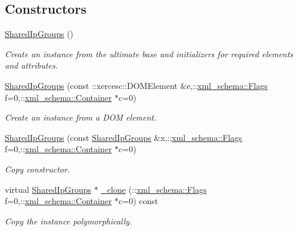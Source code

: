 \subsection*{Constructors}
\begin{DoxyCompactItemize}
\item 
\hypertarget{classopenstack_1_1xml_1_1SharedIpGroups_ac4c11c01375108c9f27a5f9433c47719}{
\hyperlink{classopenstack_1_1xml_1_1SharedIpGroups_ac4c11c01375108c9f27a5f9433c47719}{SharedIpGroups} ()}
\label{classopenstack_1_1xml_1_1SharedIpGroups_ac4c11c01375108c9f27a5f9433c47719}

\begin{DoxyCompactList}\small\item\em Create an instance from the ultimate base and initializers for required elements and attributes. \item\end{DoxyCompactList}\item 
\hyperlink{classopenstack_1_1xml_1_1SharedIpGroups_a8ccdc3b5fc791c908045187ae51ff7b8}{SharedIpGroups} (const ::xercesc::DOMElement \&e,::\hyperlink{namespacexml__schema_affb4c227cbd9aa7453dd1dc5a1401943}{xml\_\-schema::Flags} f=0,::\hyperlink{namespacexml__schema_a333dea2213742aea47a37532dec4ec27}{xml\_\-schema::Container} $\ast$c=0)
\begin{DoxyCompactList}\small\item\em Create an instance from a DOM element. \item\end{DoxyCompactList}\item 
\hyperlink{classopenstack_1_1xml_1_1SharedIpGroups_a34b8e9f02a9ef09aa1c9fd775ab0c7f0}{SharedIpGroups} (const \hyperlink{classopenstack_1_1xml_1_1SharedIpGroups}{SharedIpGroups} \&x,::\hyperlink{namespacexml__schema_affb4c227cbd9aa7453dd1dc5a1401943}{xml\_\-schema::Flags} f=0,::\hyperlink{namespacexml__schema_a333dea2213742aea47a37532dec4ec27}{xml\_\-schema::Container} $\ast$c=0)
\begin{DoxyCompactList}\small\item\em Copy constructor. \item\end{DoxyCompactList}\item 
virtual \hyperlink{classopenstack_1_1xml_1_1SharedIpGroups}{SharedIpGroups} $\ast$ \hyperlink{classopenstack_1_1xml_1_1SharedIpGroups_ae6aa97845838232f97d27d2caee76906}{\_\-clone} (::\hyperlink{namespacexml__schema_affb4c227cbd9aa7453dd1dc5a1401943}{xml\_\-schema::Flags} f=0,::\hyperlink{namespacexml__schema_a333dea2213742aea47a37532dec4ec27}{xml\_\-schema::Container} $\ast$c=0) const 
\begin{DoxyCompactList}\small\item\em Copy the instance polymorphically. \item\end{DoxyCompactList}\end{DoxyCompactItemize}


